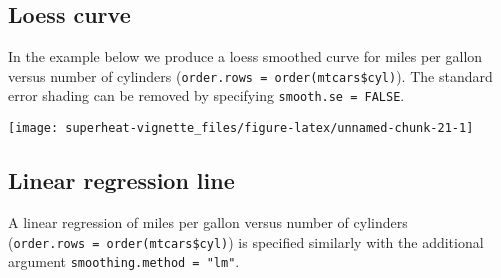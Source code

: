 \documentclass[]{book}
\newenvironment{Shaded}{\begin{snugshade}}{\end{snugshade}}
\newcommand{\KeywordTok}[1]{\textcolor[rgb]{0.13,0.29,0.53}{\textbf{{#1}}}}
\newcommand{\DataTypeTok}[1]{\textcolor[rgb]{0.13,0.29,0.53}{{#1}}}
\newcommand{\DecValTok}[1]{\textcolor[rgb]{0.00,0.00,0.81}{{#1}}}
\newcommand{\FloatTok}[1]{\textcolor[rgb]{0.00,0.00,0.81}{{#1}}}
\newcommand{\StringTok}[1]{\textcolor[rgb]{0.31,0.60,0.02}{{#1}}}
\newcommand{\CommentTok}[1]{\textcolor[rgb]{0.56,0.35,0.01}{\textit{{#1}}}}
\newcommand{\NormalTok}[1]{{#1}}
\theoremstyle{definition}
\theoremstyle{definition}
\theoremstyle{remark}
\begin{document}
\subsection{Loess curve}\label{loess-curve}

In the example below we produce a loess smoothed curve for miles per
gallon versus number of cylinders
(\texttt{order.rows\ =\ order(mtcars\$cyl)}). The standard error shading
can be removed by specifying \texttt{smooth.se\ =\ FALSE}.

\begin{Shaded}
\end{Shaded}

\begin{center}\texttt{[image: superheat-vignette\_files/figure-latex/unnamed-chunk-21-1]} \end{center}

\subsection{Linear regression line}\label{linear-regression-line}

A linear regression of miles per gallon versus number of cylinders
(\texttt{order.rows\ =\ order(mtcars\$cyl)}) is specified similarly with
the additional argument \texttt{smoothing.method\ =\ "lm"}.
\end{document}
